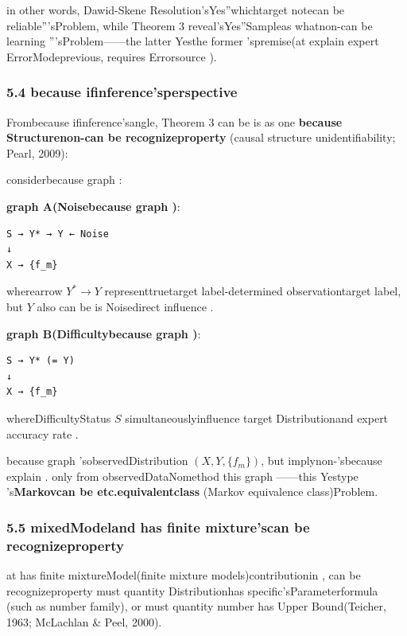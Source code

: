 \documentclass[
  12pt,
]{article}
\begin{document}
in other words, Dawid-Skene Resolution'sYes''whichtarget notecan be reliable'''sProblem, while  Theorem 3
reveal'sYes''Sampleas whatnon-can be learning '''sProblem------the latter Yesthe former 'spremise(at explain expert ErrorModeprevious, requires Errorsource ). 

\subsubsection{5.4
because ifinference'sperspective}\label{ux56e0ux679cux63a8ux65adux7684ux89c6ux89d2}

Frombecause ifinference'sangle, Theorem 3
can be is as one \textbf{because Structurenon-can be recognizeproperty }(causal structure
unidentifiability; Pearl, 2009):

considerbecause graph : 

\textbf{graph  A(Noisebecause graph )}: 

\begin{verbatim}
S → Y* → Y ← Noise
↓
X → {f_m}
\end{verbatim}

wherearrow \(Y^* \to Y\) representtruetarget label-determined observationtarget label, but  \(Y\)
also can be is Noisedirect influence . 

\textbf{graph  B(Difficultybecause graph )}: 

\begin{verbatim}
S → Y* (= Y)
↓
X → {f_m}
\end{verbatim}

whereDifficultyStatus \(S\) simultaneouslyinfluence target Distributionand expert accuracy rate . 

because graph 'sobservedDistribution
\((X, Y, \{f_m\})\), but implynon-'sbecause explain . only from observedDataNomethod this graph ------this Yestype 's\textbf{Markovcan be etc.equivalentclass }(Markov
equivalence class)Problem. 

\subsubsection{5.5
mixedModeland has finite mixture'scan be recognizeproperty }\label{ux6df7ux5408ux6a21ux578bux4e0eux6709ux9650ux6df7ux5408ux7684ux53efux8bc6ux522bux6027}

at has finite mixtureModel(finite mixture
models)contributionin , can be recognizeproperty must quantity Distributionhas specific'sParameterformula (such as number family), or must quantity number has Upper Bound(Teicher,
1963; McLachlan \& Peel, 2000). 
\end{document}

